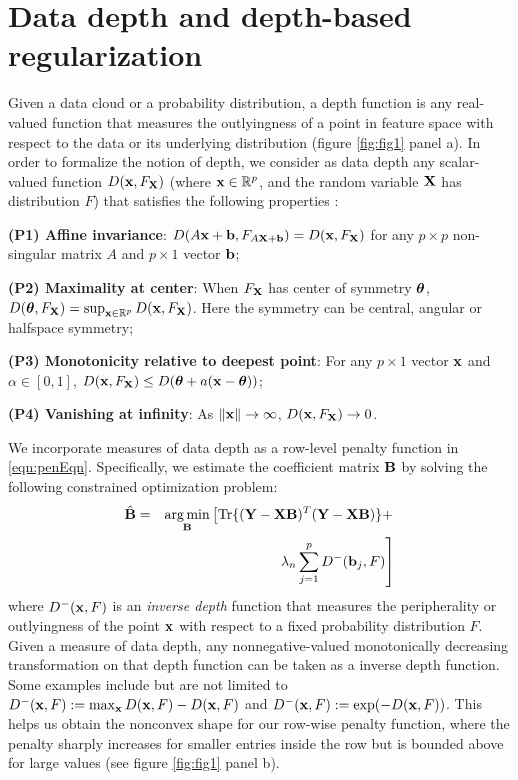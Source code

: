 
\section{Data depth and depth-based regularization}
\label{sec:sec2}

Given a data cloud or a probability distribution, a depth function is any real-valued function that measures the outlyingness of a point in feature space with respect to the data or its underlying distribution (figure \ref{fig:fig1} panel a). In order to formalize the notion of depth, we consider as data depth any scalar-valued function $D({\bf{x}}, F_{\mathbf{X}})$ (where ${\bf{x}} \in \mathbb R^p$, and the random variable ${\mathbf{X}}$ has distribution $F$) that satisfies the following properties \citep{Liu90}:

\noindent \textbf{(P1) Affine invariance}: $D(A{\bf{x}} + {\bf{b}}, F_{A{\mathbf{X}} + {\bf{b}}}) = D({\bf{x}}, F_{\mathbf{X}})$ for any $p \times p$ non-singular matrix $A$ and $p \times 1$ vector ${\bf{b}}$;

\noindent \textbf{(P2) Maximality at center}: When $F_{\mathbf{X}}$ has center of symmetry ${\boldsymbol{\theta}}$, $D({\boldsymbol{\theta}}, F_{\mathbf{X}}) = \sup_{{\bf{x}} \in \mathbb R^p} D({\bf{x}}, F_{\mathbf{X}})$. Here the symmetry can be central, angular or halfspace symmetry;

\noindent \textbf{(P3) Monotonicity relative to deepest point}: For any $p \times 1$ vector ${\bf{x}}$ and $\alpha \in [0,1]$, $D({\bf{x}}, F_{\mathbf{X}}) \leq D({\boldsymbol{\theta}} + a({\bf{x}} - {\boldsymbol{\theta}}))$;

\noindent \textbf{(P4) Vanishing at infinity}: As $\| {\bf{x}} \| \rightarrow \infty$, $D({\bf{x}}, F_{\mathbf{X}}) \rightarrow 0$.

We incorporate measures of data depth as a row-level penalty function in \ref{eqn:penEqn}. Specifically, we estimate the coefficient matrix ${\mathbf{B}}$ by solving the following constrained optimization problem:
%
\begin{eqnarray}
\hat{{\mathbf{B}}} &=& \operatorname*{arg\,min}_{\mathbf{B}} \left[ \operatorname*{Tr} \{ ({\mathbf{Y}} - {\mathbf{X}}{\mathbf{B}})^T ( {\mathbf{Y}} - {\mathbf{X}}{\mathbf{B}}) \} + \right. \notag\\
&& \left. \lambda_n \sum_{j=1}^p D^-( {\bf{b}}_j, F) \right]\label{eqn:eqn02}
\end{eqnarray}
%
where $D^-( {\bf{x}}, F)$ is an {\it inverse depth} function that measures the peripherality or outlyingness of the point ${\bf{x}}$ with respect to a fixed probability distribution $F$. Given a measure of data depth, any nonnegative-valued monotonically decreasing transformation on that depth function can be taken as a inverse depth function. Some examples include but are not limited to $D^-({\bf{x}}, F) := \max_{\bf{x}} D({\bf{x}}, F) - D({\bf{x}}, F)$ and $D^-({\bf{x}}, F) := \exp(-D({\bf{x}}, F))$. This helps us obtain the nonconvex shape for our row-wise penalty function, where the penalty sharply increases for smaller entries inside the row but is bounded above for large values (see figure \ref{fig:fig1} panel b).
